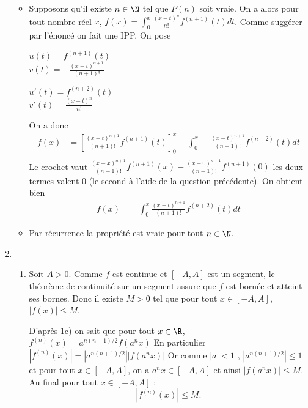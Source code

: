 \begin{correction}
\begin{enumerate}
\begin{itemize}
\item Supposons qu'il existe $n\in \N$  tel que $P(n)$ soit vraie. On  a alors pour tout nombre réel $x$, $f(x) = \int_0^x \frac{(x-t)^n}{n!} f^{(n+1)} (t) dt$. 
Comme suggérer par l'énoncé on fait une IPP. On pose 
\begin{minipage}{0.4 \textwidth}
$u(t) = f^{(n+1)}(t)$\\
$v(t) = -\frac{(x-t)^{n+1}}{(n+1)!}$
\end{minipage}
\begin{minipage}{0.4 \textwidth}
$u'(t) = f^{(n+2)}(t)$\\
$v'(t) = \frac{(x-t)^{n}}{n!}$
\end{minipage}
On a donc 
\begin{align*}
f(x)&=\left[ \frac{(x-t)^{n+1}}{(n+1)!}  f^{(n+1)}(t)\right]_0^x - \int_0^x - \frac{(x-t)^{n+1}}{(n+1)!}f^{(n+2)}(t)dt\\
\end{align*}
Le crochet vaut $\frac{(x-x)^{n+1}}{(n+1)!}  f^{(n+1)}(x)- \frac{(x-0)^{n+1}}{(n+1)!}  f^{(n+1)}(0)$ les deux termes valent 0 (le second à l'aide de la question précédente). On obtient bien 
 \begin{align*}
f(x)&=  \int_0^x  \frac{(x-t)^{n+1}}{(n+1)!}f^{(n+2)}(t)dt
\end{align*}
\item Par récurrence la propriété est vraie pour tout $n\in \N$. 
\end{itemize}
\item \begin{enumerate}
\item Soit $A>0$. Comme $f$ est continue et $[-A,A]$ est un segment, le théorème de continuité sur un segment assure que $f$ est bornée et atteint ses bornes. Donc il existe $M>0$ tel que pour tout $x\in [-A,A]$, $|f(x)|\leq M$.

D'après 1c) on sait que pour tout $x\in \R$, $f^{(n)} (x) = a^{n(n+1)/2} f(a^n x)$ En particulier $|f^{(n)} (x)| =|a^{n(n+1)/2}| | f(a^n x)|$ 
Or comme $|a|<1$ , $|a^{n(n+1)/2}|  \leq 1$ et pour tout $x\in [-A,A]$, on a $a^n x \in  [-A,A]$ et ainsi $ | f(a^n x)| \leq M$. Au final pour tout  $x\in [-A,A]$ : 
$$|f^{(n)} (x)|\leq M.$$



\end{enumerate}
\end{enumerate}
\end{correction}
